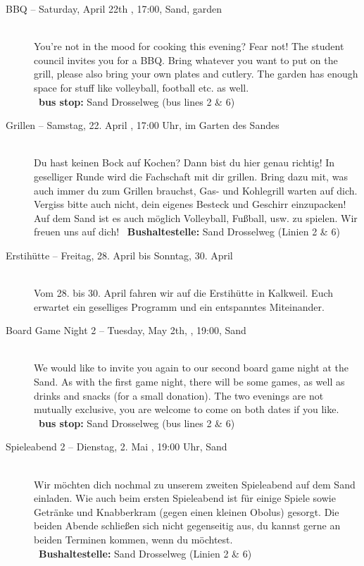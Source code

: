 \begin{description}

\ifml
	\item[BBQ -- Saturday, April 22th \YEAR, 17:00, Sand, garden]~\\
	You're not in the mood for cooking this evening? Fear not!
    The student council invites you for a BBQ. Bring whatever you want to put on the grill,
    please also bring your own plates and cutlery. The garden has enough space for stuff like volleyball, football etc. as well.\\
	~\textbf{bus stop:} Sand Drosselweg (bus lines 2 \& 6)
\else
	\item[Grillen -- Samstag, 22. April \YEAR, 17:00 Uhr, im Garten des Sandes]~\\
	Du hast keinen Bock auf Kochen? Dann bist du hier genau richtig! In geselliger Runde wird die Fachschaft mit dir grillen.
	Bring dazu mit, was auch immer du zum Grillen brauchst, Gas- und Kohlegrill warten auf dich. Vergiss bitte auch nicht, dein eigenes Besteck und Geschirr einzupacken!\\
	Auf dem Sand ist es auch möglich Volleyball, Fußball, usw. zu spielen. Wir freuen uns auf dich!
	~\textbf{Bushaltestelle:} Sand Drosselweg (Linien 2 \& 6)
\fi

\ifml
\else
	\item[Erstihütte -- Freitag, 28. April bis Sonntag, 30. April \YEAR]~\\
	Vom 28. bis 30. April fahren wir auf die Erstihütte in Kalkweil.
	Euch erwartet ein geselliges Programm und ein entspanntes Miteinander.
\fi

\ifml
	\item[Board Game Night 2 -- Tuesday, May 2th, \YEAR, 19:00, Sand]~\\
	We would like to invite you again to our second board game night at the Sand.
	As with the first game night, there will be some games, as well as drinks and snacks (for a small donation).
	The two evenings are not mutually exclusive, you are welcome to come on both dates if you like.
	~\textbf{bus stop:} Sand Drosselweg (bus lines 2 \& 6)
\else
	\item[Spieleabend 2 -- Dienstag, 2. Mai \YEAR, 19:00 Uhr, Sand]~\\
	Wir möchten dich nochmal zu unserem zweiten Spieleabend auf dem Sand einladen.
	Wie auch beim ersten Spieleabend ist für einige Spiele sowie Getränke und Knabberkram (gegen einen kleinen Obolus) gesorgt.
	Die beiden Abende schließen sich nicht gegenseitig aus, du kannst gerne an beiden Terminen kommen, wenn du möchtest.\\
	~\textbf{Bushaltestelle:} Sand Drosselweg (Linien 2 \& 6)
\fi


\end{description}
